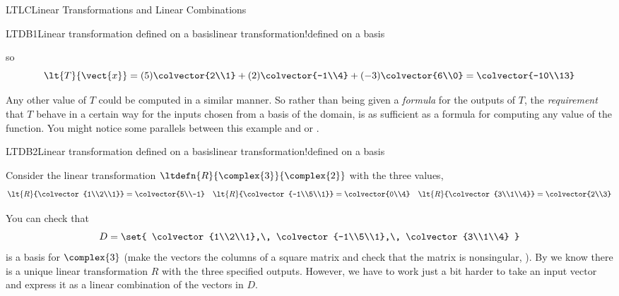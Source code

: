 \begin{subsect}{LTLC}{Linear Transformations and Linear Combinations}
\begin{example}{LTDB1}{Linear transformation defined on a basis}{linear transformation!defined on a basis}
\begin{para}
\begin{equation*}
\end{equation*}
%
so
%
\begin{equation*}
\lt{T}{\vect{x}}=(5)\colvector{2\\1}+ (2)\colvector{-1\\4}+ (-3)\colvector{6\\0}=\colvector{-10\\13}
\end{equation*}
\end{para}
%
\begin{para}Any other value of $T$ could be computed in a similar manner.  So rather than being given a {\em formula} for the outputs of $T$, the {\em requirement} that $T$ behave in a certain way for the inputs chosen from a basis of the domain, is as sufficient as a formula for computing any value of the function.  You might notice some parallels between this example and  or .\end{para}
%
\end{example}
%
\begin{example}{LTDB2}{Linear transformation defined on a basis}{linear transformation!defined on a basis}
\begin{para}Consider the linear transformation $\ltdefn{R}{\complex{3}}{\complex{2}}$ with the three values,
%
\begin{align*}
\lt{R}{\colvector{1\\2\\1}}=\colvector{5\\-1}&&
\lt{R}{\colvector{-1\\5\\1}}=\colvector{0\\4}&&
\lt{R}{\colvector{3\\1\\4}}=\colvector{2\\3}
\end{align*}
\end{para}
%
\begin{para}You can check that
%
\begin{equation*}
D=\set{
\colvector{1\\2\\1},\,
\colvector{-1\\5\\1},\,
\colvector{3\\1\\4}
}
\end{equation*}
%
is a basis for $\complex{3}$ (make the vectors the columns of a square matrix and check that the matrix is nonsingular,  ).  By  we know there is a unique linear transformation $R$ with the three specified outputs.  However, we have to work just a bit harder to take an input vector and express it as a linear combination of the vectors in $D$.\end{para}

\end{example}
\end{subsect}
